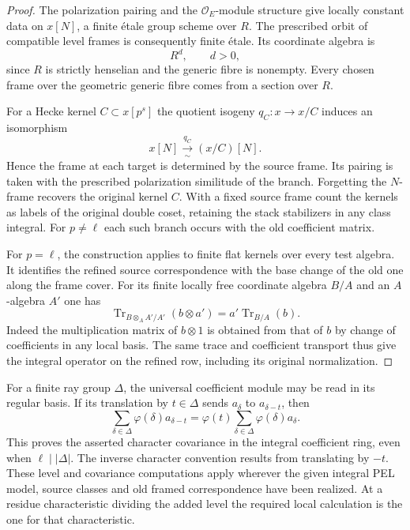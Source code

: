 \begin{proof}
The polarization pairing and the \(\mathcal O_E\)-module
structure give locally constant data on \(x[N]\), a finite
\'etale group scheme over \(R\). The prescribed orbit of
compatible level frames is consequently finite \'etale.
Its coordinate algebra is
\[
                    R^d,\qquad d>0 ,
\]
since \(R\) is strictly henselian and the generic fibre is
nonempty. Every chosen frame over the geometric generic fibre
comes from a section over \(R\).

For a Hecke kernel \(C\subset x[p^s]\) the quotient isogeny
\(q_C:x\to x/C\) induces an isomorphism
\[
                x[N]\xrightarrow[\;\sim\;]{q_C}(x/C)[N].
\]
Hence the frame at each target is determined by the source
frame. Its pairing is taken with the prescribed polarization
similitude of the branch. Forgetting the \(N\)-frame recovers
the original kernel \(C\). With a fixed source frame count the
kernels as labels of the original double coset, retaining the
stack stabilizers in any class integral. For \(p\ne\ell\) each
such branch occurs with the old coefficient matrix.

For \(p=\ell\), the construction applies to finite flat kernels
over every test algebra. It identifies the refined source
correspondence with the base change of the old one along the
frame cover. For its finite locally free coordinate algebra
\(B/A\) and an \(A\)-algebra \(A'\) one has
\[
 \operatorname{Tr}_{B\otimes_A A'/A'}(b\otimes a')
       =a'\operatorname{Tr}_{B/A}(b).
\]
Indeed the multiplication matrix of \(b\otimes1\) is obtained
from that of \(b\) by change of coefficients in any local
basis. The same trace and coefficient transport thus give the
integral operator on the refined row, including its original
normalization.
\end{proof}

For a finite ray group \(\Delta\), the universal coefficient
module may be read in its regular basis. If its translation by
\(t\in\Delta\) sends \(a_\delta\) to \(a_{\delta-t}\), then
\[
 \sum_{\delta\in\Delta}\varphi(\delta)a_{\delta-t}
    =\varphi(t)\sum_{\delta\in\Delta}\varphi(\delta)a_\delta .
\]
This proves the asserted character covariance in the integral
coefficient ring, even when \(\ell\mid|\Delta|\). The inverse
character convention results from translating by \(-t\).
These level and covariance computations apply wherever the
given integral PEL model, source classes and old framed
correspondence have been realized. At a residue characteristic
dividing the added level the required local calculation is the
one for that characteristic.

